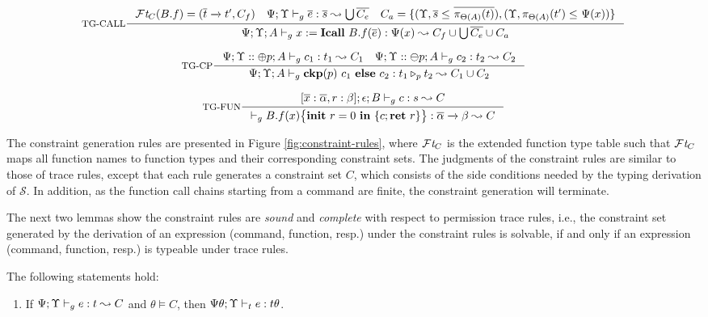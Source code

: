 {{{\begin{figure*}[ht]
\begin{scriptsize}
\[
\inference[TG-CALL]
{
\FT_{C}(B.f) = (\overline{t} \xrightarrow{} t', C_{f})  \quad
\Psi;\trace \vdash_{g} \overline{e} : \overline{s} \leadsto \bigcup \overline{C_{e}} \quad
C_{a} = \{(\trace, \overline{s}\leq_{} \overline{\app{t}{\Theta(A)}}), (\trace, \app{t'}{\Theta(A)}\leq_{} \Psi(x))\} }
{
\Psi;\trace; A \vdash_{g} \lcCALL{x}{B.f}{\overline{e}} : \Psi(x)\leadsto C_{f} \cup \bigcup\overline{C_{e}}\cup C_{a}
}
\]

\[
\inference[TG-CP]
{
\Psi;\trace::\tplus p; A \vdash_{g} c_1 : t_1  \leadsto C_1 \quad
 \Psi;\trace::\tminus p; A \vdash_{g} c_2 : t_2  \leadsto C_2
 }
{\Psi;\trace; A \vdash_{g} \lcCP{p}{c_1}{c_2} : \omerge{p}{t_1}{t_2} \leadsto C_1\cup C_2}
\]

\[
\inference[TG-FUN]
{
[\overline{x}: \overline{\alpha},\lpRES:\beta]; \epsilon; B \vdash_{g} c : s  \leadsto C
}
{
\vdash_{g} \lpPROG{B.f}{x}{c}{\lpRES} :  \overline{\alpha}\xrightarrow{} \beta  \leadsto  C
}
\]
\end{scriptsize}
\caption{Constraint generation rules for expressions, commands, and functions, with function type table {\FT}.}
\label{fig:constraint-rules}
\end{figure*}

The constraint generation rules are presented in Figure \ref{fig:constraint-rules}, where
$\mathcal{F}\mathit{t}_{C}$ is the extended function type table such that $\mathcal{F}\mathit{t}_{C}$ maps all function names to function types and their corresponding constraint sets.
The judgments of the constraint rules are similar to those of trace rules, except that
each rule generates a constraint set $C$, which consists of the side conditions needed by the typing derivation of $\mathcal{S}$.
In addition,  as the function call chains starting from a command are finite, the constraint generation will terminate.

 
The next two lemmas show the constraint rules are \emph{sound} and \emph{complete} with respect to permission trace rules, i.e., the constraint set generated by the derivation of an expression (command, function, resp.) under the constraint rules is solvable, if and only if an expression (command, function, resp.) is typeable under trace rules.

\begin{lemma}\label{lem:cgrsound}
The following statements hold:
{\myeqsize
\begin{enumerate}[label={(\alph*)}]
\item\label{lem:cgrsound-1} If $\Psi;\Upsilon \vdash_{g} e : t\leadsto C$ and $\theta \vDash C$, then $\Psi\theta;\Upsilon \vdash_{t} e : t\theta $.


\end{enumerate}}
\end{lemma}}}}
